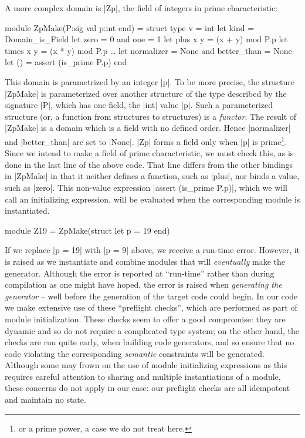 \documentclass{elsart}
\begin{document}
A more complex domain is |Zp|, the field of integers in prime
characteristic:
\begin{code}[commandchars=\\\{\}]
module ZpMake(P:sig val p:int end) = struct
    type v = int
    let kind = Domain_is_Field
    let zero = 0 and one = 1
    let plus x y = (x + y) mod P.p
    let times x y = (x * y) mod P.p
    \dots
    let normalizer = None and better_than = None
    let () = assert (is_prime P.p)
end
\end{code}
This domain is parametrized by an integer |p|. 
To be more precise, the structure |ZpMake| is
parameterized over another structure of the type described by
the signature |P|, which has one field, the |int| value |p|.
Such a parameterized structure (or, a function from structures to
structures) is a \emph{functor}. The result of |ZpMake| is a domain which is a
field with no defined order. Hence
|normalizer| and |better_than| are set to |None|. |Zp| forms
a field only when |p| is prime\footnote{or a prime power, a case we do
not treat here.}.  Since we intend to make a field of prime characteristic, 
we must check this, as is done
in the last line of the above code. That line differs from the other 
bindings in |ZpMake| in that it neither defines a function, such as
|plus|, nor binds a value, such as |zero|. This non-value
expression |assert (is_prime P.p)|, which we will call an initializing
expression, will be evaluated
when the corresponding module is instantiated.
\begin{code}
module Z19 = ZpMake(struct let p = 19 end)
\end{code}
If we
replace |p = 19| with |p = 9| above, we receive a run-time
error. However, it is raised as we instantiate and combine modules that
will \emph{eventually} make the generator.  Although the error is reported at
``run-time'' rather than during compilation as one might have hoped, the error
is raised when \emph{generating the generator} -- well before the
generation of the target code could begin.  In our code we make
extensive use of these ``preflight checks'', which are performed as part of
module initialization. These checks seem to offer a good compromise:
they are dynamic and so do not require a complicated type system; on
the other hand, the checks are run quite early, when building
code generators, and so ensure that no code violating the
corresponding \emph{semantic} constraints will be generated. Although
some may frown on the use of module initializing expressions 
as this requires careful attention to sharing and multiple instantiations
of a module, these concerns do not apply in our case: our preflight
checks are all idempotent and maintain no state.
\end{document}
